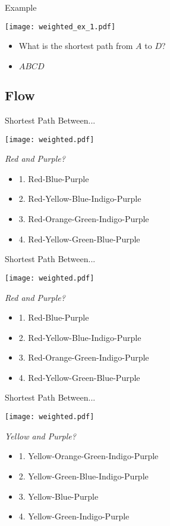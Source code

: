 \documentclass{beamer}
\begin{document}
\begin{frame}{Example}
	\centerline{\texttt{[image: weighted\_ex\_1.pdf]}}
	\begin{itemize}
	\item
		What is the shortest path from $A$ to $D$?
	\item
		$ABCD$
	\end{itemize}
\end{frame}

\subsection{Flow}
\begin{frame}{Shortest Path Between...}
	\centerline{\texttt{[image: weighted.pdf]}}
	\textit{Red and Purple?}
        \begin{itemize}
	\item
		1. Red-Blue-Purple
	\item
		2. Red-Yellow-Blue-Indigo-Purple
	\item
		3. Red-Orange-Green-Indigo-Purple
	\item
		4. Red-Yellow-Green-Blue-Purple
	\end{itemize}
\end{frame}

\begin{frame}{Shortest Path Between...}
	\centerline{\texttt{[image: weighted.pdf]}}
	\textit{Red and Purple?}
        \begin{itemize}
	\item
		\alert{1. Red-Blue-Purple}
	\item
		2. Red-Yellow-Blue-Indigo-Purple
	\item
		3. Red-Orange-Green-Indigo-Purple
	\item
		4. Red-Yellow-Green-Blue-Purple
	\end{itemize}
\end{frame}

\begin{frame}{Shortest Path Between...}
	\centerline{\texttt{[image: weighted.pdf]}}
	\textit{Yellow and Purple?}
        \begin{itemize}
	\item
		1. Yellow-Orange-Green-Indigo-Purple
	\item
		2. Yellow-Green-Blue-Indigo-Purple
	\item
		3. Yellow-Blue-Purple
	\item
		4. Yellow-Green-Indigo-Purple
	\end{itemize}
\end{frame}
\end{document}
